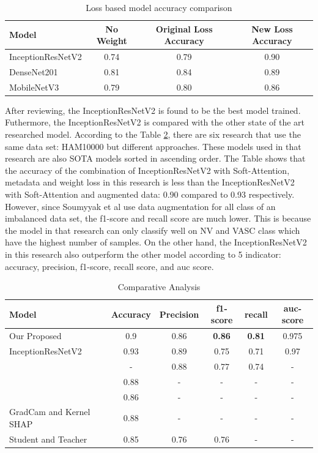\documentclass[sensors,article,submit,pdftex,moreauthors]{Definitions/mdpi}
\begin{document}
\begin{table}[H]
	\centering
	\begin{tabular}{| l | c | c | c |}
		\hline
		Model & No Weight & Original Loss Accuracy & New Loss Accuracy\\
		\hline
		InceptionResNetV2 & 0.74 & 0.79 & 0.90\\
		DenseNet201 & 0.81 & 0.84 & 0.89\\
		MobileNetV3 & 0.79 & 0.80 & 0.86\\
		\hline
	\end{tabular}
	\caption{Loss based model accuracy comparison}
	\label{table:loss-comparision}
\end{table} 

After reviewing, the InceptionResNetV2 is found to be the best model trained. Futhermore, the InceptionResNetV2 is compared with the other state of the art researched model. According to the Table \ref{table:comparative-analysis}, there are six research that use the same data set: HAM10000 but different approaches. These models used in that research are also SOTA models sorted in ascending order. The Table shows that the accuracy of the combination of InceptionResNetV2 with Soft-Attention, metadata and weight loss in this research is less than the InceptionResNetV2 with Soft-Attention and augmented data: 0.90 compared to 0.93 respectively. However, since Soumyyak et al use data augmentation for all class of an imbalanced data set, the f1-score and recall score are much lower. This is because the model in that research can only classify well on NV and VASC class which have the highest number of samples. On the other hand, the InceptionResNetV2 in this research also outperform the other model according to 5 indicator: accuracy, precision, f1-score, recall score, and auc score. 
\FloatBarrier
\begin{table}[H]
	\centering
	\begin{tabular}{| p{4cm} | c | c | c | c | c |}
		\hline
		Model & Accuracy & Precision & f1-score & recall & auc-score\\
		\hline
		Our Proposed & 0.9	& 0.86 &\textbf{0.86} & \textbf{0.81} & 0.975\\
		\hline
		InceptionResNetV2\cite{03358} & 0.93 & 0.89 & 0.75 & 0.71 & 0.97\\
		\hline
		\cite{03798} & - & 0.88 & 0.77 & 0.74 & - \\
		\hline
		\cite{09418} & 0.88 & - & - & - & - \\
		\hline
		\cite{01284} & 0.86 & - & - & - & - \\
		\hline
		GradCam and Kernel SHAP\cite{06612} & 0.88 & - & - & - & - \\
		\hline
		Student and Teacher\cite{03225} & 0.85 & 0.76 & 0.76 & - & - \\
		\hline
	\end{tabular}
	\caption{Comparative Analysis}
	\label{table:comparative-analysis}
\end{table} 
\end{document}
